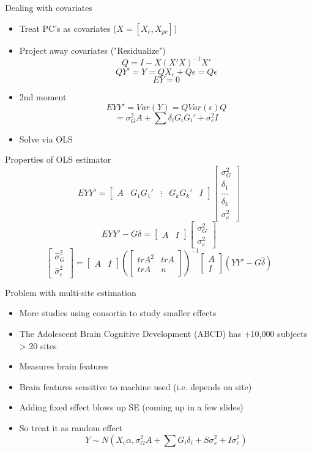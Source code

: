 \documentclass[
  ignorenonframetext,
]{beamer}
\begin{document}
\begin{frame}{Dealing with covariates}
\begin{itemize}
	\item Treat PC's as covariates ($X = [X_c, X_{pc}]$)
	\item Project away covariates ("Residualize")
	$$ Q = I - X(X'X)^{-1}X' $$
	$$ QY'= Y = QX_c + Q\epsilon = Q\epsilon $$
	$$ EY = 0$$ 
	\item 2nd moment
	$$ EYY' = Var(Y) = Q Var(\epsilon) Q $$
	$$ = \sigma_G^2 A + \sum \delta_i G_iG_i'+ \sigma_e^2 I$$
	\item Solve via OLS
\end{itemize}
\end{frame}

\begin{frame}{Properties of OLS estimator}
$$EYY' = \begin{bmatrix}
A & G_1G_1' & \vdots & G_kG_k' & I 
\end{bmatrix} \begin{bmatrix}
\sigma_G^2 \\ \delta_1 \\ \dots \\ \delta_k \\ \sigma_e^2
\end{bmatrix} $$
$$EYY' - G\delta = \begin{bmatrix}
A & I
\end{bmatrix}
\begin{bmatrix}
\sigma_G^2 \\ \sigma_e^2
\end{bmatrix} $$
$$\begin{bmatrix}
\hat\sigma_G^2 \\ \hat \sigma_e^2
\end{bmatrix} = \begin{bmatrix}
A & I 
\end{bmatrix}
(\begin{bmatrix}
trA^2 & trA \\
trA & n  
\end{bmatrix})^{-1}
\begin{bmatrix}
A \\ I 
\end{bmatrix}(YY' - G\hat \delta)$$
\end{frame}


\begin{frame}{Problem with multi-site estimation}
\begin{itemize}
	\item More studies using consortia to study smaller effects
	\item The Adolescent Brain Cognitive Development (ABCD) has +10,000 subjects > 20 sites
	\item Measures brain features
	\item Brain features sensitive to machine used (i.e. depends on site)
	\item Adding fixed effect blows up SE (coming up in a few slides)
	\item So treat it as random effect
	$$Y \sim N(X_c\alpha, \sigma_G^2A + \sum G_i\delta_i + S\sigma_s^2 + I\sigma_e^2) $$
\end{itemize}
\end{frame}
\end{document}
